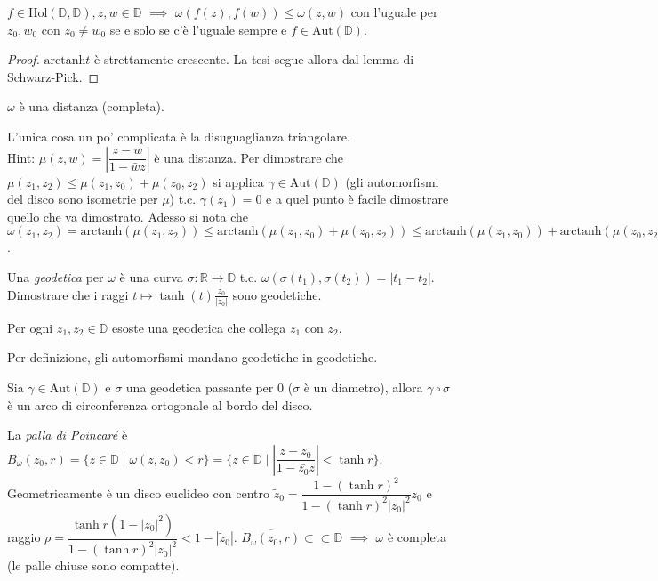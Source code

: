 \begin{cor}
  $f \in \text{Hol}(\mathbb{D}, \mathbb{D}), z, w \in \mathbb{D}$ $\implies$ $\omega(f(z), f(w)) \le \omega(z, w)$ con l'uguale per $z_0, w_0$ con $z_0 \not=w_0$ se e solo se c'è l'uguale sempre e $f \in \text{Aut}(\mathbb{D})$.
\end{cor}

\begin{proof}
  $\text{arctanh}t$ è strettamente crescente. La tesi segue allora dal lemma di Schwarz-Pick.
\end{proof}

\begin{exc}
  $\omega$ è una distanza (completa).
\end{exc}

\begin{sol}
  L'unica cosa un po' complicata è la disuguaglianza triangolare. \\
  Hint: $\mu(z, w)=\left|\dfrac{z-w}{1-\bar{w}z}\right|$ è una distanza. Per dimostrare che $\mu(z_1, z_2) \le \mu(z_1, z_0)+\mu(z_0, z_2)$ si applica $\gamma \in \text{Aut}(\mathbb{D})$ (gli automorfismi del disco sono isometrie per $\mu$) t.c. $\gamma(z_1)=0$ e a quel punto è facile dimostrare quello che va dimostrato.
  Adesso si nota che $\omega(z_1, z_2)=\text{arctanh}(\mu(z_1, z_2)) \le \text{arctanh}(\mu(z_1, z_0)+\mu(z_0, z_2)) \le \text{arctanh}(\mu(z_1, z_0))+\text{arctanh}(\mu(z_0, z_2))$.
\end{sol}

\begin{exc}
  Una \textit{geodetica} per $\omega$ è una curva $\sigma: \mathbb{R} \longrightarrow \mathbb{D}$ t.c. $\omega(\sigma(t_1), \sigma(t_2))=|t_1-t_2|$. Dimostrare che i raggi $t \longmapsto \tanh{(t)}\frac{z_0}{|z_0|}$ sono geodetiche.
\end{exc}

\begin{cor}
  Per ogni $z_1, z_2 \in \mathbb{D}$ esoste una geodetica che collega $z_1$ con $z_2$.
\end{cor}

Per definizione, gli automorfismi mandano geodetiche in geodetiche.

\begin{exc}
  Sia $\gamma \in \text{Aut}(\mathbb{D})$ e $\sigma$ una geodetica passante per $0$ ($\sigma$ è un diametro), allora $\gamma \circ \sigma$ è un arco di circonferenza ortogonale al bordo del disco.
\end{exc}

\begin{defn}
  La \textit{palla di Poincaré} è $B_{\omega}(z_0, r)=\{z \in \mathbb{D} \mid \omega(z, z_0)<r\}=\{z \in \mathbb{D} \mid \left|\dfrac{z-z_0}{1-\bar{z_0}z}\right|<\tanh{r}\}$.
  Geometricamente è un disco euclideo con centro $\tilde{z}_0=\dfrac{1-(\tanh{r})^2}{1-(\tanh{r})^2|z_0|^2}z_0$ e raggio $\rho=\dfrac{\tanh{r}(1-|z_0|^2)}{1-(\tanh{r})^2|z_0|^2}<1-|\tilde{z}_0|$.
  $\overline{B_{\omega}(z_0, r)} \subset \subset \mathbb{D}$ $\implies$ $\omega$ è completa (le palle chiuse sono compatte).
\end{defn}
